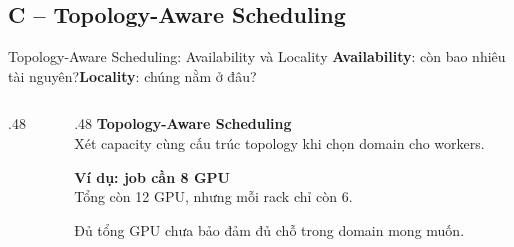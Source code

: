 \subsection{C -- Topology-Aware Scheduling}

\begin{frame}{Topology-Aware Scheduling: Availability và Locality}
 \small
 \textbf{Availability}: còn bao nhiêu tài nguyên?\quad\textbf{Locality}: chúng nằm ở đâu?
 \par\vspace{.3cm}
 \begin{columns}[c,onlytextwidth]
  \begin{column}{.48\textwidth}
   \centering
  \end{column}
  \begin{column}{.48\textwidth}
   \textbf{Topology-Aware Scheduling}\\
   Xét capacity cùng cấu trúc topology khi chọn domain cho workers.
   \par\vspace{.3cm}
   \textbf{Ví dụ: job cần 8 GPU}\\
   Tổng còn 12 GPU, nhưng mỗi rack chỉ còn 6.
   \par\vspace{.25cm}
   Đủ tổng GPU chưa bảo đảm đủ chỗ trong domain mong muốn.
  \end{column}
 \end{columns}
\end{frame}

